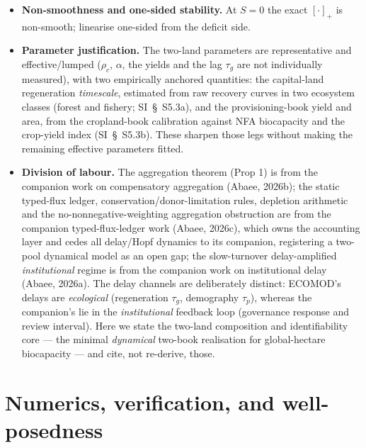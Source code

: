\documentclass[11pt]{article}
\begin{document}
\begin{itemize}
\item \textbf{Non-smoothness and one-sided stability.} At $S=0$ the exact $[\cdot]_+$ is non-smooth; linearise one-sided from the deficit side.
\item \textbf{Parameter justification.} The two-land parameters are representative and effective/lumped ($\rho_c$, $\alpha$, the yields and the lag $\tau_g$ are not individually measured), with two empirically anchored quantities: the capital-land regeneration \emph{timescale}, estimated from raw recovery curves in two ecosystem classes (forest and fishery; SI~\S\ S5.3a), and the provisioning-book yield and area, from the cropland-book calibration against NFA biocapacity and the crop-yield index (SI~\S\ S5.3b). These sharpen those legs without making the remaining effective parameters fitted.
\item \textbf{Division of labour.} The aggregation theorem (Prop 1) is from the companion work on compensatory aggregation (Abaee, 2026b); the static typed-flux ledger, conservation/donor-limitation rules, depletion arithmetic and the no-nonnegative-weighting aggregation obstruction are from the companion typed-flux-ledger work (Abaee, 2026c), which owns the accounting layer and cedes all delay/Hopf dynamics to its companion, registering a two-pool dynamical model as an open gap; the slow-turnover delay-amplified \emph{institutional} regime is from the companion work on institutional delay (Abaee, 2026a). The delay channels are deliberately distinct: ECOMOD's delays are \emph{ecological} (regeneration $\tau_g$, demography $\tau_p$), whereas the companion's lie in the \emph{institutional} feedback loop (governance response and review interval). Here we state the two-land composition and identifiability core --- the minimal \emph{dynamical} two-book realisation for global-hectare biocapacity --- and cite, not re-derive, those.
\end{itemize}

\section{Numerics, verification, and well-posedness}
\end{document}

